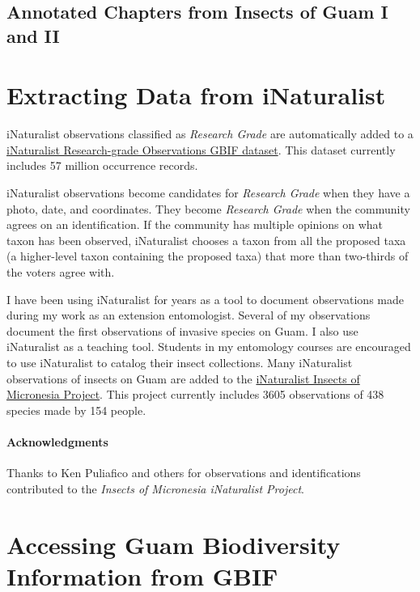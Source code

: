\documentclass[12pt,letterpaper,english,bibliography=totocnumbered, abstract=on]{scrartcl}
\begin{document}
\subsection{Annotated Chapters from Insects of Guam I and II}
\newrefsection[blr]
\nocite{*}
\printbibliography[heading=none]



\pagebreak
\section{Extracting Data from iNaturalist}

iNaturalist observations classified as \textit{Research Grade} are automatically added to a \href{https://www.gbif.org/dataset/50c9509d-22c7-4a22-a47d-8c48425ef4a7}{iNaturalist Research-grade Observations GBIF dataset}. This dataset currently includes 57 million occurrence records. 

iNaturalist observations become candidates for \textit{Research Grade} when they have a photo, date, and coordinates. They become \textit{Research Grade} when the community agrees on an identification. If the community has multiple opinions on what taxon has been observed, iNaturalist chooses a taxon from all the proposed taxa (a higher-level taxon containing the proposed taxa) that more than two-thirds of the voters agree with.

I have been using iNaturalist for years as a tool to document observations made during my work as an extension entomologist. Several of my observations document the first observations of invasive species on Guam. I also use iNaturalist as a teaching tool. Students in my entomology courses are encouraged to use iNaturalist to catalog their insect collections. Many iNaturalist observations of insects on Guam are added to the \href{https://www.inaturalist.org/projects/insects-of-micronesia}{iNaturalist Insects of Micronesia Project}. This project currently includes 3605 observations of 438 species made by 154 people. 

\paragraph{Acknowledgments} Thanks to Ken Puliafico and others for observations and identifications contributed to the \textit{Insects of Micronesia iNaturalist Project}.





\pagebreak
\section{Accessing Guam Biodiversity Information from GBIF}
\newrefsection[my.bib]
\end{document}

